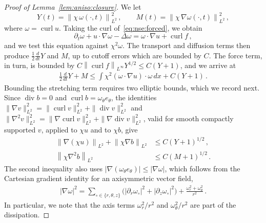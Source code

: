 \documentclass[11pt,reqno]{amsproc}
\numberwithin{equation}{section}
\theoremstyle{remark}
\newcommand{\p}{\partial}
\newcommand{\norm}[1]{\left\|#1\right\|}
\newcommand{\curl}{\operatorname{curl}}
\renewcommand{\div}{\operatorname{div}}
\begin{document}
\begin{proof}[Proof of Lemma~\ref{lem:aniso:closure}]
We let
\[
Y(t)=\norm{\chi\,\omega(\cdot,t)}_{L^2}^2
\,,\qquad
M(t)=\norm{\chi\,\nabla\omega(\cdot,t)}_{L^2}^2
\,,
\]
where $\omega=\curl u$. Taking the curl of~\eqref{eq:nse:forced}, we obtain
\[
\p_t\omega+u\cdot\nabla\omega-\Delta\omega=\omega\cdot\nabla u+\curl f
\,,
\]
and we test this equation against $\chi^2\omega$. The transport and diffusion terms then produce $\frac12 \frac{d}{dt} Y$ and $M$, up to cutoff errors which are bounded by $C$. The force term, in turn, is bounded by $C\norm{\curl f}_{L^\infty}Y^{1/2}\le C(Y+1)$, and we arrive at
\begin{align}
\frac12 \frac{d}{dt} Y +M\le\int\chi^2(\omega\cdot\nabla u)\cdot\omega\,dx+C(Y+1)
\,.
\label{eq:aniso:closure:tested}
\end{align}
Bounding the stretching term requires two elliptic bounds, which we record next. Since $\div b=0$ and $\curl b=\omega_\theta e_\theta$, the identities $\|\nabla v\|_{L^2}^2=\|\curl v\|_{L^2}^2+\|\div v\|_{L^2}^2$ and $\|\nabla^2v\|_{L^2}^2=\|\nabla\curl v\|_{L^2}^2+\|\nabla\div v\|_{L^2}^2$, valid for smooth compactly supported $v$, applied to $\chi u$ and to $\chi b$, give
\begin{subequations}
\label{eq:aniso:closure:elliptic}
\begin{align}
\norm{\nabla(\chi u)}_{L^2}+\norm{\chi\nabla b}_{L^2}
&\le C(Y+1)^{1/2}
\,,\\
\norm{\chi\nabla^2b}_{L^2}
&\le C(M+1)^{1/2}
\,.
\end{align}
\end{subequations}
The second inequality also uses $|\nabla(\omega_\theta e_\theta)|\le|\nabla\omega|$, which follows from the Cartesian gradient identity for an axisymmetric vector field,
\begin{align}
|\nabla\omega|^2
=\sum_{\circ\in\{r,\theta,z\}}\bigl(|\p_r\omega_\circ|^2+|\p_z\omega_\circ|^2\bigr)
+\frac{\omega_r^2+\omega_\theta^2}{r^2}
\,.
\label{eq:aniso:closure:gradient}
\end{align}
In particular, we note that the axis terms $\omega_r^2/r^2$ and $\omega_\theta^2/r^2$ are part of the dissipation.


\end{proof}
\end{document}
